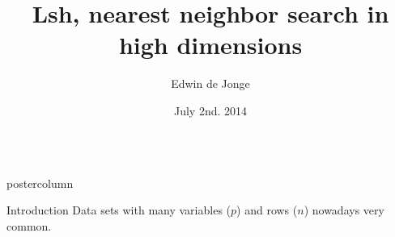 \documentclass[final,hyperref={pdfpagelabels=false}]{beamer}
\title{\huge Lsh, nearest neighbor search in high dimensions}
\author{Edwin de Jonge}
\institute[Statistics Netherlands]{Methodology Department, Statistics Netherlands, Den Haag, Netherlands}
\date[July. 2nd, 2014]{July 2nd. 2014}
\newlength{\columnheight}
\begin{document}
\begin{frame}
  \begin{columns}
    \begin{column}{.49\textwidth}
      \begin{beamercolorbox}[center,wd=\textwidth]{postercolumn}
        \begin{minipage}[T]{.95\textwidth}  %
          \parbox[t][\columnheight]{\textwidth}{ %
            \begin{block}{Introduction}
            Data sets with many variables ($p$) and rows ($n$) nowadays 
            very common. 
            

\end{block}}
\end{minipage}
\end{beamercolorbox}
\end{column}
\end{columns}
\end{frame}
\end{document}
